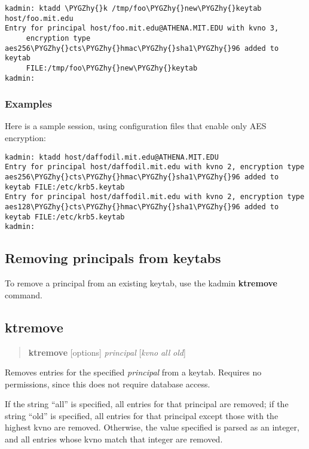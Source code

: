\documentclass[letterpaper,10pt,english]{sphinxmanual}
\def\PYGZhy{\char`\-}
\begin{document}
\begin{Verbatim}[commandchars=\\\{\}]
kadmin: ktadd \PYGZhy{}k /tmp/foo\PYGZhy{}new\PYGZhy{}keytab host/foo.mit.edu
Entry for principal host/foo.mit.edu@ATHENA.MIT.EDU with kvno 3,
     encryption type aes256\PYGZhy{}cts\PYGZhy{}hmac\PYGZhy{}sha1\PYGZhy{}96 added to keytab
     FILE:/tmp/foo\PYGZhy{}new\PYGZhy{}keytab
kadmin:
\end{Verbatim}


\subsubsection{Examples}
\label{admin/appl_servers:examples}
Here is a sample session, using configuration files that enable only
AES encryption:

\begin{Verbatim}[commandchars=\\\{\}]
kadmin: ktadd host/daffodil.mit.edu@ATHENA.MIT.EDU
Entry for principal host/daffodil.mit.edu with kvno 2, encryption type aes256\PYGZhy{}cts\PYGZhy{}hmac\PYGZhy{}sha1\PYGZhy{}96 added to keytab FILE:/etc/krb5.keytab
Entry for principal host/daffodil.mit.edu with kvno 2, encryption type aes128\PYGZhy{}cts\PYGZhy{}hmac\PYGZhy{}sha1\PYGZhy{}96 added to keytab FILE:/etc/krb5.keytab
kadmin:
\end{Verbatim}


\subsection{Removing principals from keytabs}
\label{admin/appl_servers:removing-principals-from-keytabs}
To remove a principal from an existing keytab, use the kadmin
\textbf{ktremove} command.


\subsection{ktremove}
\label{admin/appl_servers:ktremove}\begin{quote}

\textbf{ktremove} {[}options{]} \emph{principal} {[}\emph{kvno} \textbar{} \emph{all} \textbar{} \emph{old}{]}
\end{quote}

Removes entries for the specified \emph{principal} from a keytab.  Requires
no permissions, since this does not require database access.

If the string ``all'' is specified, all entries for that principal are
removed; if the string ``old'' is specified, all entries for that
principal except those with the highest kvno are removed.  Otherwise,
the value specified is parsed as an integer, and all entries whose
kvno match that integer are removed.
\end{document}
